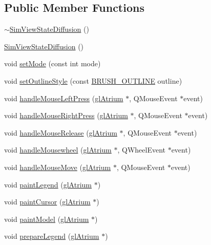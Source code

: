 \subsection*{Public Member Functions}
\begin{DoxyCompactItemize}
\item 
\hyperlink{class_sim_view_state_diffusion_a0a9cd4ae5c64bbe8434d3c696eb7be4d}{$\sim$\+Sim\+View\+State\+Diffusion} ()
\item 
\hyperlink{class_sim_view_state_diffusion_af2d9dfaf5a6b3e09097515ad8f999605}{Sim\+View\+State\+Diffusion} ()
\item 
void \hyperlink{class_sim_view_state_diffusion_a399cf7a08f4c6dccaf350665a2c120df}{set\+Mode} (const int mode)
\item 
void \hyperlink{class_sim_view_state_diffusion_ac5b42fac66fcba6d2e268d187c756578}{set\+Outline\+Style} (const \hyperlink{_sim_view_state_8h_a64cb6e33858a4b9db209712bab2f0e99}{B\+R\+U\+S\+H\+\_\+\+O\+U\+T\+L\+I\+N\+E} outline)
\item 
void \hyperlink{class_sim_view_state_diffusion_a921e715622d8d2365d206a62b27743b3}{handle\+Mouse\+Left\+Press} (\hyperlink{classgl_atrium}{gl\+Atrium} $\ast$, Q\+Mouse\+Event $\ast$event)
\item 
void \hyperlink{class_sim_view_state_diffusion_ac7f6e1d2e85c3ada328497a96e81f14a}{handle\+Mouse\+Right\+Press} (\hyperlink{classgl_atrium}{gl\+Atrium} $\ast$, Q\+Mouse\+Event $\ast$event)
\item 
void \hyperlink{class_sim_view_state_diffusion_acecedd98fde1cacd09c4dda625879c87}{handle\+Mouse\+Release} (\hyperlink{classgl_atrium}{gl\+Atrium} $\ast$, Q\+Mouse\+Event $\ast$event)
\item 
void \hyperlink{class_sim_view_state_diffusion_a49bba5caf4d67fe1372fe2476d8cdd76}{handle\+Mousewheel} (\hyperlink{classgl_atrium}{gl\+Atrium} $\ast$, Q\+Wheel\+Event $\ast$event)
\item 
void \hyperlink{class_sim_view_state_diffusion_aac90b9a9b9ff19af8818223f499f0d02}{handle\+Mouse\+Move} (\hyperlink{classgl_atrium}{gl\+Atrium} $\ast$, Q\+Mouse\+Event $\ast$event)
\item 
void \hyperlink{class_sim_view_state_diffusion_a98a24411d5567042c8812e0ca762b62d}{paint\+Legend} (\hyperlink{classgl_atrium}{gl\+Atrium} $\ast$)
\item 
void \hyperlink{class_sim_view_state_diffusion_ab241942ec392bd039985dbc5762eb073}{paint\+Cursor} (\hyperlink{classgl_atrium}{gl\+Atrium} $\ast$)
\item 
void \hyperlink{class_sim_view_state_diffusion_abb9cbbba81242ac63e391ad38953bc2f}{paint\+Model} (\hyperlink{classgl_atrium}{gl\+Atrium} $\ast$)
\item 
void \hyperlink{class_sim_view_state_diffusion_afc42be7984dd936f3be4abe614af0edd}{prepare\+Legend} (\hyperlink{classgl_atrium}{gl\+Atrium} $\ast$)
\end{DoxyCompactItemize}
